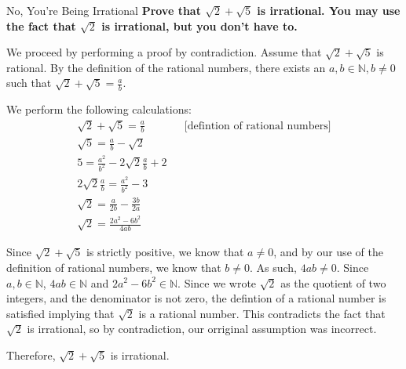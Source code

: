 \documentclass[11pt, nopagenumbers]{adamblan-hw}
\begin{document}
\begin{question}{No, You're Being Irrational}
\textbf{Prove that $\sqrt{2} + \sqrt{5}$ is irrational. You may use the fact that $\sqrt{2}$ is irrational, but you don't have to.}

We proceed by performing a proof by contradiction. Assume that $\sqrt{2} + \sqrt{5}$ is rational.
By the definition of the rational numbers, there exists an $a, b \in \mathbb{N}, b\neq 0$ such that
$\sqrt{2} + \sqrt{5} = \frac{a}{b}$.

We perform the following calculations:
\begin{align*}
\sqrt{2} + \sqrt{5} = \frac{a}{b} && \text{[defintion of rational numbers]} \\
\sqrt{5} = \frac{a}{b} - \sqrt{2} \\
5 = \frac{a^2}{b^2} - 2\sqrt{2}\frac{a}{b} + 2 \\
2\sqrt{2}\frac{a}{b} = \frac{a^2}{b^2} - 3 \\
\sqrt{2} = \frac{a}{2b} - \frac{3b}{2a} \\
\sqrt{2} = \frac{2a^2 - 6b^2}{4ab}
\end{align*}

Since $\sqrt{2} + \sqrt{5}$ is strictly positive, we know that $a \neq 0$,
and by our use of the definition of rational numbers, we know that $b \neq 0$.
As such, $4ab \neq 0$. Since $a, b \in \mathbb{N}$, $4ab \in \mathbb{N}$ and $2a^2 - 6b^2 \in \mathbb{N}$.
Since we wrote $\sqrt{2}$ as the quotient of two integers, and the denominator is not zero,
the defintion of a rational number is satisfied implying that $\sqrt{2}$ is a rational number.
This contradicts the fact that $\sqrt{2}$ is irrational, so by contradiction, our orriginal assumption
was incorrect.

Therefore, $\sqrt{2} + \sqrt{5}$ is irrational.

\end{question}
\end{document}
